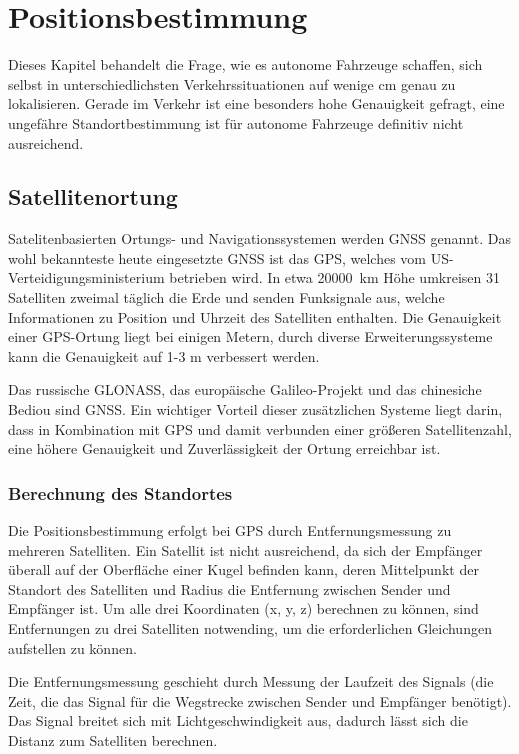 \chapter{Positionsbestimmung}\label{kapitel-2}

Dieses Kapitel behandelt die Frage, wie es autonome Fahrzeuge schaffen, sich selbst in unterschiedlichsten Verkehrssituationen auf wenige \si{\centi\meter} genau zu lokalisieren. Gerade im Verkehr ist eine besonders hohe Genauigkeit gefragt, eine ungefähre Standortbestimmung ist für autonome Fahrzeuge definitiv nicht ausreichend.


\section{Satellitenortung}

Satelitenbasierten Ortungs- und Navigationssystemen werden \ac{GNSS} genannt. Das wohl bekannteste heute eingesetzte \ac{GNSS} ist das \ac{GPS}, welches vom US-Verteidigungsministerium betrieben wird.  In etwa \SI{20000}{\kilo\meter} Höhe umkreisen 31 Satelliten zweimal täglich die Erde und senden Funksignale aus, welche Informationen zu Position und Uhrzeit des Satelliten enthalten. Die Genauigkeit einer \ac{GPS}-Ortung liegt bei einigen Metern, durch diverse Erweiterungssysteme kann die Genauigkeit auf 1-3 \si{\meter} verbessert werden.

Das russische GLONASS, das europäische Galileo-Projekt und das chinesiche Bediou sind \ac{GNSS}. Ein wichtiger Vorteil dieser zusätzlichen Systeme liegt darin, dass in Kombination mit \ac{GPS} und damit verbunden einer größeren Satellitenzahl, eine höhere Genauigkeit und Zuverlässigkeit der Ortung erreichbar ist.

\subsection{Berechnung des Standortes}

Die Positionsbestimmung erfolgt bei \ac{GPS} durch Entfernungsmessung zu mehreren Satelliten. Ein Satellit ist nicht ausreichend, da sich der Empfänger überall auf der Oberfläche einer Kugel befinden kann, deren Mittelpunkt der Standort des Satelliten und Radius die Entfernung zwischen Sender und Empfänger ist. Um alle drei Koordinaten (x, y, z) berechnen zu können, sind Entfernungen zu drei Satelliten notwending, um die erforderlichen Gleichungen aufstellen zu können.

Die Entfernungsmessung geschieht durch Messung der Laufzeit des Signals (\dH die Zeit, die das Signal für die Wegstrecke zwischen Sender und Empfänger benötigt). Das Signal breitet sich mit Lichtgeschwindigkeit aus, dadurch lässt sich die Distanz zum Satelliten berechnen.

